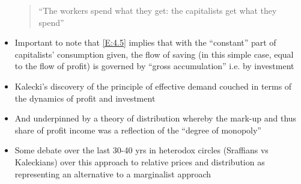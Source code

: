 \documentclass{article}
\begin{document}
\begin{itemize}
		\begin{quote}
			``The workers spend what they get: the capitalists get what they spend''
		\end{quote}
		\item Important to note that \cref{E:4.5} implies that with the ``constant'' part of capitalists' consumption given, the flow of saving (in this simple case, equal to the flow of profit) is governed by ``gross accumulation'' i.e. by investment\
		\item Kalecki's discovery of the principle of effective demand couched in terms of the dynamics of profit and investment
		\item And underpinned by a theory of distribution whereby the mark-up and thus share of profit income was a reflection of the ``degree of monopoly''
		\item Some debate over the last 30-40 yrs in heterodox circles (Sraffians vs Kaleckians) over this approach to relative prices and distribution as representing an alternative to a marginalist approach
	\end{itemize}
\end{document}
